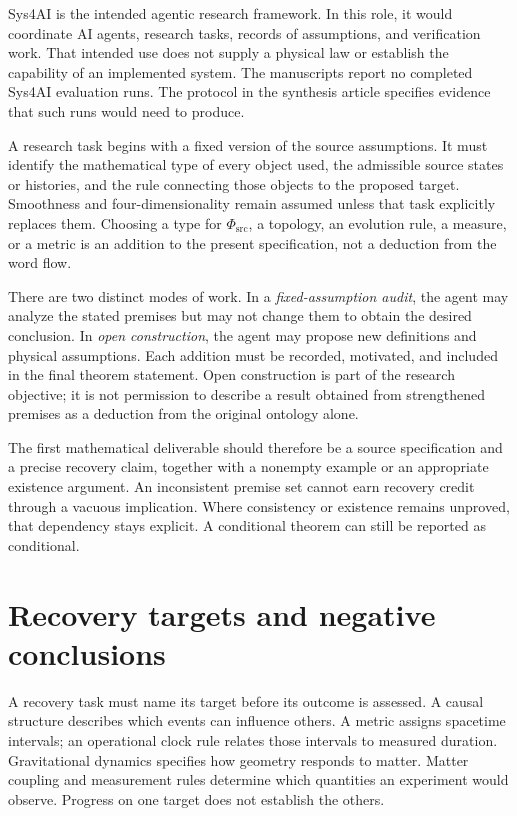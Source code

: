 \documentclass[11pt,oneside]{report}
\newcommand{\PhiSrc}{\Phi_{\mathrm{src}}}
\theoremstyle{remark}
\numberwithin{definition}{chapter}
\numberwithin{proposition}{chapter}
\numberwithin{remark}{chapter}
\begin{document}
Sys4AI is the intended agentic research framework. In this role, it would coordinate AI agents, research tasks, records of assumptions, and verification work. That intended use does not supply a physical law or establish the capability of an implemented system. The manuscripts report no completed Sys4AI evaluation runs. The protocol in the synthesis article specifies evidence that such runs would need to produce.

A research task begins with a fixed version of the source assumptions. It must identify the mathematical type of every object used, the admissible source states or histories, and the rule connecting those objects to the proposed target. Smoothness and four-dimensionality remain assumed unless that task explicitly replaces them. Choosing a type for $\PhiSrc$, a topology, an evolution rule, a measure, or a metric is an addition to the present specification, not a deduction from the word flow.

There are two distinct modes of work. In a \emph{fixed-assumption audit}, the agent may analyze the stated premises but may not change them to obtain the desired conclusion. In \emph{open construction}, the agent may propose new definitions and physical assumptions. Each addition must be recorded, motivated, and included in the final theorem statement. Open construction is part of the research objective; it is not permission to describe a result obtained from strengthened premises as a deduction from the original ontology alone.

The first mathematical deliverable should therefore be a source specification and a precise recovery claim, together with a nonempty example or an appropriate existence argument. An inconsistent premise set cannot earn recovery credit through a vacuous implication. Where consistency or existence remains unproved, that dependency stays explicit. A conditional theorem can still be reported as conditional.

\section{Recovery targets and negative conclusions}
A recovery task must name its target before its outcome is assessed. A causal structure describes which events can influence others. A metric assigns spacetime intervals; an operational clock rule relates those intervals to measured duration. Gravitational dynamics specifies how geometry responds to matter. Matter coupling and measurement rules determine which quantities an experiment would observe. Progress on one target does not establish the others.
\end{document}
